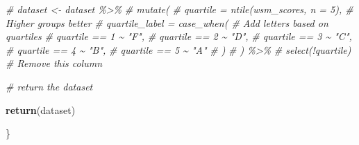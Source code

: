 \documentclass[
]{article}
\newenvironment{Shaded}{\begin{snugshade}}{\end{snugshade}}
\newcommand{\CommentTok}[1]{\textcolor[rgb]{0.56,0.35,0.01}{\textit{#1}}}
\newcommand{\FunctionTok}[1]{\textcolor[rgb]{0.13,0.29,0.53}{\textbf{#1}}}
\newcommand{\NormalTok}[1]{#1}
\begin{document}
\begin{Shaded}
\begin{Highlighting}[]
  \CommentTok{\# dataset \textless{}{-} dataset \%\textgreater{}\% }
  \CommentTok{\#   mutate(}
  \CommentTok{\#     quartile = ntile(wsm\_scores, n = 5), \# Higher groups better }
  \CommentTok{\#     quartile\_label = case\_when( \# Add letters based on quartiles }
  \CommentTok{\#       quartile == 1 \textasciitilde{} "F", }
  \CommentTok{\#       quartile == 2 \textasciitilde{} "D",}
  \CommentTok{\#       quartile == 3 \textasciitilde{} "C",}
  \CommentTok{\#       quartile == 4 \textasciitilde{} "B", }
  \CommentTok{\#       quartile == 5 \textasciitilde{} "A"}
  \CommentTok{\#     )}
  \CommentTok{\#   ) \%\textgreater{}\% }
  \CommentTok{\#   select(!quartile) \# Remove this column }
  
  \CommentTok{\# return the dataset }
  
  \FunctionTok{return}\NormalTok{(dataset)}
  
\NormalTok{\}}
\end{Highlighting}
\end{Shaded}
\end{document}
